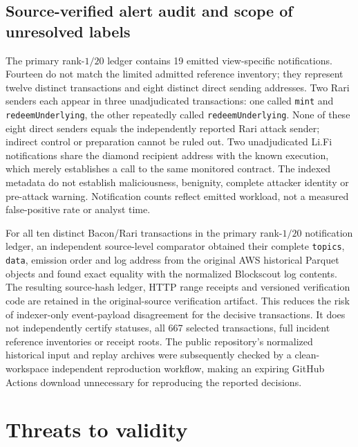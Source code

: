 \documentclass[preprint,12pt,authoryear]{elsarticle}
\begin{document}
\subsection{Source-verified alert audit and scope of unresolved labels}
The primary rank-$1/20$ ledger contains 19 emitted view-specific notifications. Fourteen do not match the limited admitted reference inventory; they represent twelve distinct transactions and eight distinct direct sending addresses. Two Rari senders each appear in three unadjudicated transactions: one called \texttt{mint} and \texttt{redeemUnderlying}, the other repeatedly called \texttt{redeemUnderlying}. None of these eight direct senders equals the independently reported Rari attack sender; indirect control or preparation cannot be ruled out. Two unadjudicated Li.Fi notifications share the diamond recipient address with the known execution, which merely establishes a call to the same monitored contract. The indexed metadata do not establish maliciousness, benignity, complete attacker identity or pre-attack warning. Notification counts reflect emitted workload, not a measured false-positive rate or analyst time.

For all ten distinct Bacon/Rari transactions in the primary rank-$1/20$ notification ledger, an independent source-level comparator obtained their complete \texttt{topics}, \texttt{data}, emission order and log address from the original AWS historical Parquet objects and found exact equality with the normalized Blockscout log contents. The resulting source-hash ledger, HTTP range receipts and versioned verification code are retained in the original-source verification artifact. This reduces the risk of indexer-only event-payload disagreement for the decisive transactions. It does not independently certify statuses, all 667 selected transactions, full incident reference inventories or receipt roots. The public repository's normalized historical input and replay archives were subsequently checked by a clean-workspace independent reproduction workflow, making an expiring GitHub Actions download unnecessary for reproducing the reported decisions.

\section{Threats to validity}\label{sec:validity}
\end{document}
